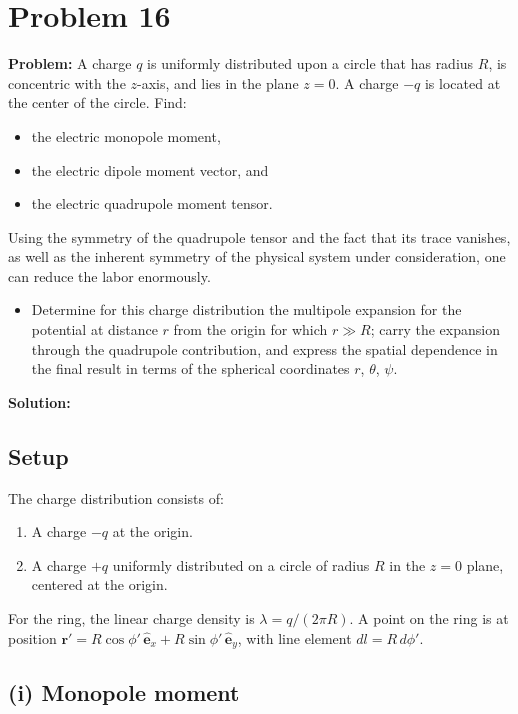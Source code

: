 \documentclass[12pt]{article}
\newcommand{\vect}[1]{\mathbf{#1}}
\newcommand{\ehat}[1]{\hat{\vect{e}}_{#1}}
\begin{document}
\section*{Problem 16}

\textbf{Problem:} A charge $q$ is uniformly distributed upon a circle that has radius $R$, is concentric with the $z$-axis, and lies in the plane $z = 0$. A charge $-q$ is located at the center of the circle. Find:
\begin{itemize}
\item[(i)] the electric monopole moment,
\item[(ii)] the electric dipole moment vector, and
\item[(iii)] the electric quadrupole moment tensor.
\end{itemize}
Using the symmetry of the quadrupole tensor and the fact that its trace vanishes, as well as the inherent symmetry of the physical system under consideration, one can reduce the labor enormously.

\begin{itemize}
\item[(b)] Determine for this charge distribution the multipole expansion for the potential at distance $r$ from the origin for which $r \gg R$; carry the expansion through the quadrupole contribution, and express the spatial dependence in the final result in terms of the spherical coordinates $r$, $\theta$, $\psi$.
\end{itemize}

\bigskip
\textbf{Solution:}

\subsection*{Setup}

The charge distribution consists of:
\begin{enumerate}
\item A charge $-q$ at the origin.
\item A charge $+q$ uniformly distributed on a circle of radius $R$ in the $z = 0$ plane, centered at the origin.
\end{enumerate}

For the ring, the linear charge density is $\lambda = q/(2\pi R)$. A point on the ring is at position $\vect{r}' = R\cos\phi'\,\ehat{x} + R\sin\phi'\,\ehat{y}$, with line element $dl = R\,d\phi'$.

\subsection*{(i) Monopole moment}
\end{document}
